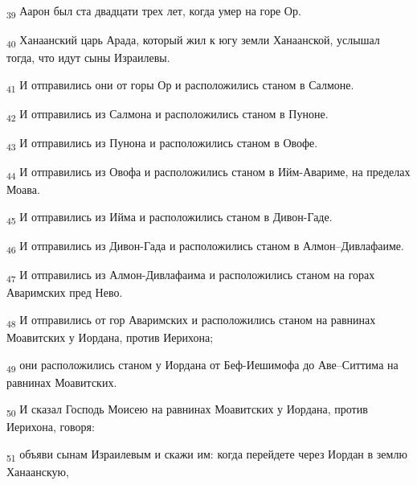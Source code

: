 \begin{tcolorbox}
\textsubscript{39} Аарон был ста двадцати трех лет, когда умер на горе Ор.
\end{tcolorbox}
\begin{tcolorbox}
\textsubscript{40} Ханаанский царь Арада, который жил к югу земли Ханаанской, услышал тогда, что идут сыны Израилевы.
\end{tcolorbox}
\begin{tcolorbox}
\textsubscript{41} И отправились они от горы Ор и расположились станом в Салмоне.
\end{tcolorbox}
\begin{tcolorbox}
\textsubscript{42} И отправились из Салмона и расположились станом в Пуноне.
\end{tcolorbox}
\begin{tcolorbox}
\textsubscript{43} И отправились из Пунона и расположились станом в Овофе.
\end{tcolorbox}
\begin{tcolorbox}
\textsubscript{44} И отправились из Овофа и расположились станом в Ийм-Авариме, на пределах Моава.
\end{tcolorbox}
\begin{tcolorbox}
\textsubscript{45} И отправились из Ийма и расположились станом в Дивон-Гаде.
\end{tcolorbox}
\begin{tcolorbox}
\textsubscript{46} И отправились из Дивон-Гада и расположились станом в Алмон--Дивлафаиме.
\end{tcolorbox}
\begin{tcolorbox}
\textsubscript{47} И отправились из Алмон-Дивлафаима и расположились станом на горах Аваримских пред Нево.
\end{tcolorbox}
\begin{tcolorbox}
\textsubscript{48} И отправились от гор Аваримских и расположились станом на равнинах Моавитских у Иордана, против Иерихона;
\end{tcolorbox}
\begin{tcolorbox}
\textsubscript{49} они расположились станом у Иордана от Беф-Иешимофа до Аве--Ситтима на равнинах Моавитских.
\end{tcolorbox}
\begin{tcolorbox}
\textsubscript{50} И сказал Господь Моисею на равнинах Моавитских у Иордана, против Иерихона, говоря:
\end{tcolorbox}
\begin{tcolorbox}
\textsubscript{51} объяви сынам Израилевым и скажи им: когда перейдете через Иордан в землю Ханаанскую,
\end{tcolorbox}
